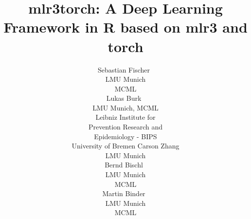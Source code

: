 \documentclass[article]{jss}
\author{Sebastian Fischer~\orcidlink{0000-0002-9609-3197} \\
    LMU Munich \\
    MCML \\
    \And Lukas Burk~\orcidlink{0000-0001-7528-3795} \\
    LMU Munich, MCML \\
    Leibniz Institute for\\Prevention Research and\\Epidemiology - BIPS \\
    University of Bremen
    \AND Carson Zhang \\
    LMU Munich \\
    \And Bernd Bischl~\orcidlink{0000-0001-6002-6980} \\
    LMU Munich \\
    MCML \\
    \And Martin Binder~\orcidlink{0009-0008-2578-2869} \\
    LMU Munich \\
    MCML \\
}
\title{mlr3torch: A Deep Learning Framework in R based on mlr3 and torch}
\theoremstyle{definition}
\begin{document}
\begin{comment}

Fullfilled:

\begin{itemize}
    \item Code distributed with JSS articles uses the GNU General Public License (GPL) version 2 or version 3 or a GPL-compatible license. JSS does NOT consider software distributed under other licenses.
\end{itemize}

Final submission:

\begin{itemize}
    \item [ ] Size limit: Upload not more than 50 MB
    \item [ ] submission must contain: pdf manuscript, source code, replication materials
    \item [ ] the manuscript must be fully and exactly reproducible on at least one platform
    \item [ ] We need to provide a simplified version of the script reproducing the results that can run on a regular PC. (https://www.jstatsoft.org/authors#manuscript-preparation) -> maybe I can just run this on GitHub actions CI?
    \item [ ] to facilitate review, authors are strongly encouraged to provide an output file that shows the results from running the single standalone replication script so that this can be compared against the results presented in the manuscript. For R submissions, this should be done by providing a file "code.html" created by running knitr::spin("code.R") on the replication script "code.R" which should include a call to sessionInfo() at the end.
    \item [ ] Source code must be submitted in ASCII files (but need to read software preparation guidelines again after submission: https://www.jstatsoft.org/authors#manuscript-preparation)
    \item [ ] manuscript can be compiled using pdflatex
    \item [ ] Special naming for programming languages and journals (don't think it applies here)
    \item [ ] Ensure consistent <- over =
    \item [ ] Cite all datasets
    \item [ ] use proglang and pkg everywhere
    \item [ ] Check spelling for programming languages and libraries
    \item [ ] check consistent references: does JSS have recommendations on how to cite github software?

\end{comment}
\end{document}
